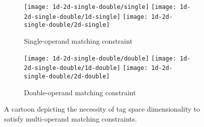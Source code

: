\begin{figure}
\begin{center}

\begin{subfigure}[b]{\columnwidth}
\centering
\texttt{[image: 1d-2d-single-double/single]}%
\texttt{[image: 1d-2d-single-double/1d-single]}%
\texttt{[image: 1d-2d-single-double/2d-single]}
\caption{
Single-operand matching constraint
}
\label{fig:single}
\end{subfigure}

\begin{subfigure}[b]{\columnwidth}
\centering
\texttt{[image: 1d-2d-single-double/double]}%
\texttt{[image: 1d-2d-single-double/1d-double]}%
\texttt{[image: 1d-2d-single-double/2d-double]}
\caption{
Double-operand matching constraint
}
\label{fig:double}
\end{subfigure}

\caption{
A cartoon depicting the necessity of tag space dimensionality to satisfy multi-operand matching constraints.
}
\label{fig:1d_2d_single_double}

\end{center}
\end{figure}
